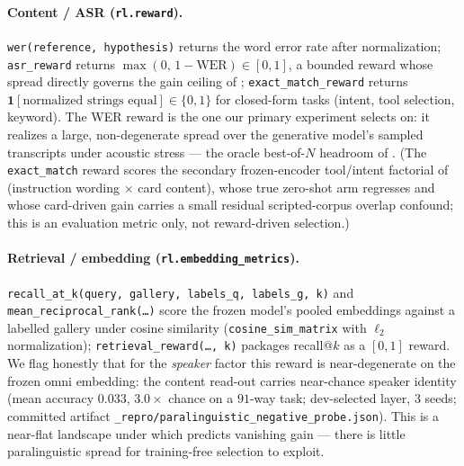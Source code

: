 \paragraph{Content / ASR (\texttt{rl.reward}).}
\texttt{wer(reference, hypothesis)} returns the word error rate after normalization;
\texttt{asr\_reward} returns $\max(0,\,1-\mathrm{WER})\in[0,1]$, a bounded reward whose spread directly
governs the gain ceiling of ; \texttt{exact\_match\_reward} returns
$\mathbf{1}[\text{normalized strings equal}]\in\{0,1\}$ for closed-form tasks (intent, tool selection,
keyword). The WER reward is the one our primary experiment selects on: it realizes a large, non-degenerate spread
over the generative model's sampled transcripts under acoustic stress --- the oracle best-of-$N$ headroom
of . (The \texttt{exact\_match} reward scores the secondary frozen-encoder tool/intent
factorial of  (instruction wording $\times$ card content), whose true zero-shot arm
regresses and whose card-driven gain carries a small residual scripted-corpus overlap confound; this
is an evaluation metric only, not reward-driven selection.)

\paragraph{Retrieval / embedding (\texttt{rl.embedding\_metrics}).}
\texttt{recall\_at\_k(query, gallery, labels\_q, labels\_g, k)} and
\texttt{mean\_reciprocal\_rank(\dots)} score the frozen model's pooled embeddings against a labelled
gallery under cosine similarity (\texttt{cosine\_sim\_matrix} with $\ell_2$ normalization);
\texttt{retrieval\_reward(\dots, k)} packages recall@$k$ as a $[0,1]$ reward. We flag honestly that
for the \emph{speaker} factor this reward is near-degenerate on the frozen omni embedding: the content
read-out carries near-chance speaker identity (mean accuracy $0.033$, $3.0\times$ chance on a $91$-way
task; dev-selected layer, $3$ seeds; committed artifact
\texttt{\_repro/paralinguistic\_negative\_probe.json}). This is a near-flat landscape under which
 predicts vanishing gain --- there is little paralinguistic spread for
training-free selection to exploit.

